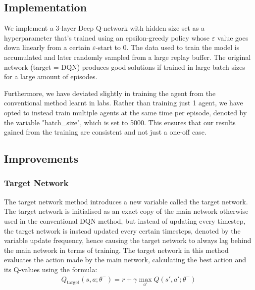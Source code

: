 \newpage{}
\subsection{Implementation}
We implement a 3-layer Deep Q-network with hidden size set as a hyperparameter that's trained using an epsilon-greedy policy whose $\varepsilon$ value goes down linearly from a certain $\varepsilon$-start to 0.
The data used to train the model is accumulated and later randomly sampled from a large replay buffer. The original network (target = DQN) produces good solutions if trained in large batch sizes for a large amount of episodes.


Furthermore, we have deviated slightly in training the agent from the conventional method learnt in labs. Rather than training just 1 agent, we have opted to instead train multiple agents at the same time per episode, denoted by the variable "batch\_size", which is set to 5000. This ensures that our results gained from the training are consistent and not just a one-off case.

\subsection{Improvements}

\subsubsection{Target Network}
The target network method introduces a new variable called the target network. The target network is initialised as an exact copy of the main network otherwise used in the conventional DQN method, but instead of updating every timestep, the target network is instead updated every certain timesteps, denoted by the variable update frequency, hence causing the target network to always lag behind the main network in terms of training.
The target network in this method evaluates the action made by the main network, calculating the best action and its Q-values using the formula:
\begin{align*}
    Q_{\text{target}}(s, a ; \theta^{-}) = r + \gamma \max_{a'} Q(s', a' ; \theta^{-})
\end{align*}

